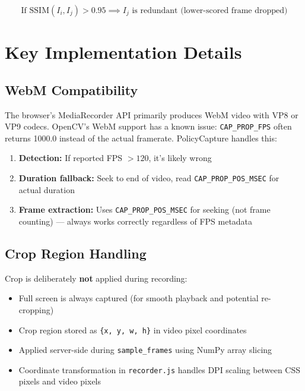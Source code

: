 \documentclass[12pt, a4paper]{article}
\newcommand{\codeinline}[1]{\texttt{\small\colorbox{codebg}{#1}}}
\newcommand{\filepath}[1]{\texttt{\small #1}}
\begin{document}
\begin{equation}
    \text{If } \text{SSIM}(I_i, I_j) > 0.95 \implies I_j \text{ is redundant (lower-scored frame dropped)}
\end{equation}

\section{Key Implementation Details}

\subsection{WebM Compatibility}

The browser's MediaRecorder API primarily produces WebM video with VP8 or VP9 codecs. OpenCV's WebM support has a known issue: \codeinline{CAP\_PROP\_FPS} often returns 1000.0 instead of the actual framerate. PolicyCapture handles this:

\begin{enumerate}
    \item \textbf{Detection:} If reported FPS $> 120$, it's likely wrong
    \item \textbf{Duration fallback:} Seek to end of video, read \codeinline{CAP\_PROP\_POS\_MSEC} for actual duration
    \item \textbf{Frame extraction:} Uses \codeinline{CAP\_PROP\_POS\_MSEC} for seeking (not frame counting) --- always works correctly regardless of FPS metadata
\end{enumerate}

\subsection{Crop Region Handling}

Crop is deliberately \textbf{not} applied during recording:
\begin{itemize}
    \item Full screen is always captured (for smooth playback and potential re-cropping)
    \item Crop region stored as \codeinline{\{x, y, w, h\}} in video pixel coordinates
    \item Applied server-side during \codeinline{sample\_frames} using NumPy array slicing
    \item Coordinate transformation in \filepath{recorder.js} handles DPI scaling between CSS pixels and video pixels
\end{itemize}
\end{document}
